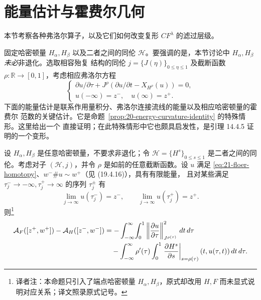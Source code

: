 \section{能量估计与霍费尔几何}
\label{sec:energy-estimates-hofer-geometry}

本节考察各种弗洛尔算子，以及它们如何改变复形 $CF^\lambda$ 的滤过层级。

固定哈密顿量 $H_\alpha,H_\beta$ 以及二者之间的同伦
$\mathcal H$。要强调的是，本节讨论中 $H_\alpha,H_\beta$ \emph{未必}非退化。选取相容殆复
结构的同伦 $j=\{J(\eta)\}_{0\leq\eta\leq1}$ 及截断函数
$\rho:\mathbb R\to[0,1]$，考虑相应弗洛尔方程
\begin{equation}
 \begin{cases}
 \partial u/\partial\tau+J^\rho
 (\partial u/\partial t-X_{H^\rho}(u))=0,\\
 u(-\infty)=z^-,\quad u(\infty)=z^+.
 \end{cases}
 \label{eq:21-floer-homotopy}
\end{equation}
下面的能量估计是联系作用量积分、弗洛尔连接流线的能量以及相应哈密顿量的霍费尔
范数的关键估计。它是命题~\ref{prop:20-energy-curvature-identity} 的特殊情形。这里给出一个
直接证明；在此特殊情形中它也颇具启发性，是引理 14.4.5 证明的一个变形。

\begin{proposition}
\label{prop:21-basic-energy-estimate}
设 $H_\alpha,H_\beta$ 是任意哈密顿量，不要求非退化；令
$\mathcal H=\{H^s\}_{0\leq s\leq1}$ 是二者之间的同伦。考虑对子
$(\mathcal H,j)$，并令 $\rho$ 是如前的任意截断函数。设 $u$ 满足
\eqref{eq:21-floer-homotopy}、$w^-\#u\sim w^+$（见 (19.4.16)），具有有限能量，
且对某些满足 $\tau_j^-\to-\infty,\tau_j^+\to\infty$ 的序列 $\tau_j^\pm$ 有
\[
 \lim_{j\to\infty}u(\tau_j^-)=z^-,\qquad
 \lim_{j\to\infty}u(\tau_j^+)=z^+.
\]
则\footnote{译者注：本命题只引入了端点哈密顿量 $H_\alpha,H_\beta$，原式却改用
$H,F$ 而未显式说明对应关系；译文照录原式记号。}
\begin{align}
 \mathcal A_F([z^+,w^+])-\mathcal A_H([z^-,w^-])
 &=-\int_{-\infty}^{\infty}\!\int_0^1
 \left\lVert\frac{\partial u}{\partial\tau}\right\rVert_{J^{\rho(\tau)}}^2
 \,dt\,d\tau \notag\\
 &\quad-\int_{-\infty}^{\infty}\rho'(\tau)\int_0^1
 \left.\frac{\partial H^s}{\partial s}\right|_{s=\rho(\tau)}
 (t,u(\tau,t))\,dt\,d\tau.
 \label{eq:21-action-energy-identity}
\end{align}
\end{proposition}

